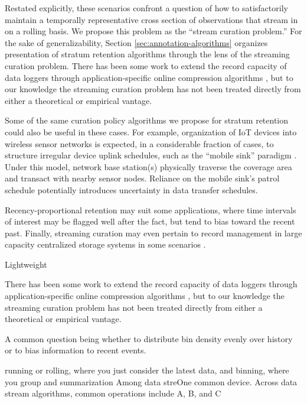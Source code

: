 Restated explicitly, these scenarios confront a question of how to satisfactorily maintain a temporally representative cross section of observations that stream in on a rolling basis.
We propose this problem as the ``stream curation problem.''
For the sake of generalizability, Section \ref{sec:annotation-algorithms} organizes presentation of stratum retention algorithms through the lens of the streaming curation problem.
There has been some work to extend the record capacity of data loggers through application-specific online compression algorithms \citep{hadiatna2016design}, but to our knowledge the streaming curation problem has not been treated directly from either a theoretical or empirical vantage.


Some of the same curation policy algorithms we propose for stratum retention could also be useful in these cases.
For example, organization of IoT devices into wireless sensor networks is expected, in a considerable fraction of cases, to structure irregular device uplink schedules, such as the ``mobile sink'' paradigm \citep{jain2022survey}.
Under this model, network base station(s) physically traverse the coverage area and transact with nearby sensor nodes.
Reliance on the mobile sink's patrol schedule potentially introduces uncertainty in data transfer schedules.

Recency-proportional retention may suit some applications, where time intervals of interest may be flagged well after the fact, but tend to bias toward the recent past.
Finally, streaming curation may even pertain to record management in large capacity centralized storage systems in some scenarios \citep{bhat2018data}.



Lightweight

There has been some work to extend the record capacity of data loggers through application-specific online compression algorithms \citep{hadiatna2016design}, but to our knowledge the streaming curation problem has not been treated directly from either a theoretical or empirical vantage.




A common question being whether to distribute bin density evenly over history or to bias information to recent events.

running or rolling, where you just consider the latest data, and binning, where you group and summarization
Among data streOne common device.
Across data stream algorithms, common operations include A, B, and C


